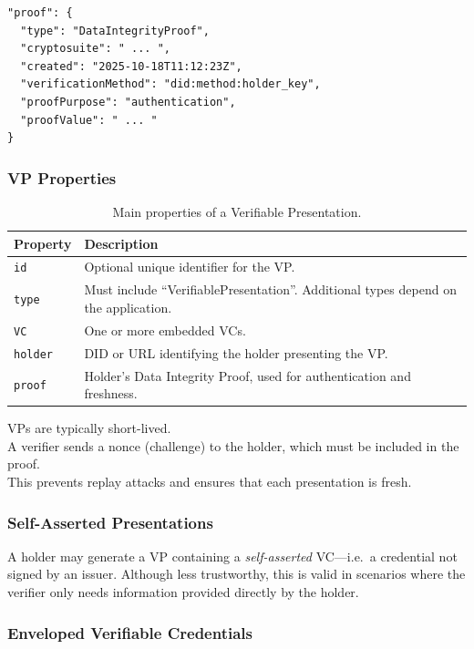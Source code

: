 \begin{verbatim}
"proof": {
  "type": "DataIntegrityProof",
  "cryptosuite": " ... ",
  "created": "2025-10-18T11:12:23Z",
  "verificationMethod": "did:method:holder_key",
  "proofPurpose": "authentication",
  "proofValue": " ... "
}
\end{verbatim}

\subsubsection*{VP Properties}

\begin{table}[h!]
\centering
\begin{tabular}{p{3cm} p{10cm}}
\toprule
\textbf{Property} & \textbf{Description} \\
\midrule
\texttt{id} & Optional unique identifier for the VP. \\
\texttt{type} & Must include ``VerifiablePresentation''. Additional types depend on the application. \\
\texttt{VC} & One or more embedded VCs. \\
\texttt{holder} & DID or URL identifying the holder presenting the VP. \\
\texttt{proof} & Holder's Data Integrity Proof, used for authentication and freshness. \\
\bottomrule
\end{tabular}
\caption{Main properties of a Verifiable Presentation.}
\end{table}


\noindent
VPs are typically short-lived.\\
A verifier sends a nonce (challenge) to the holder, which must be included in the proof. \\
This prevents replay attacks and ensures that each presentation is fresh.

\subsubsection*{Self-Asserted Presentations}

A holder may generate a VP containing a \emph{self-asserted} VC—i.e.\ a credential not
signed by an issuer.  
Although less trustworthy, this is valid in scenarios where the verifier only
needs information provided directly by the holder.

\subsubsection*{Enveloped Verifiable Credentials}

